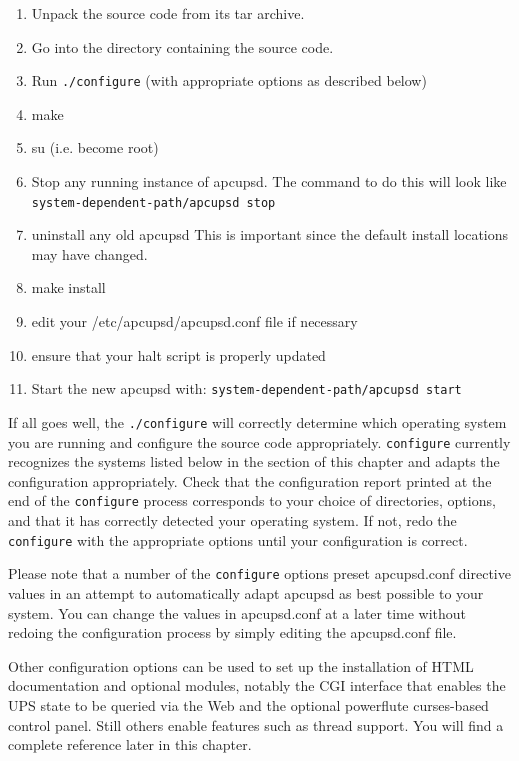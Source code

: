 \begin{enumerate}
\item Unpack the source code from its tar archive.  
\item Go into the directory containing the source code.  
\item Run {\tt ./configure} (with appropriate options as described below)  
\item make  
\item su (i.e. become root)  
\item Stop any running instance of apcupsd.  The command to do this will look
like {\tt \lt{}system-dependent-path\gt{}/apcupsd stop}  
\item uninstall any old apcupsd This is important since the default install
locations may have changed.  
\item make install  
\item edit your /etc/apcupsd/apcupsd.conf file if necessary  
\item ensure that your halt script is properly updated  
\item Start the new apcupsd with: {\tt \lt{}system-dependent-path\gt{}/apcupsd
start}  
\end{enumerate}

If all goes well, the {\tt ./configure} will correctly determine which
operating system you are running and configure the source code appropriately.
{\tt configure} currently recognizes the systems listed below in the 
section of this chapter and adapts the configuration appropriately.  Check
that the configuration report printed at the end of the {\tt configure}
process corresponds to your choice of directories, options, and that it has
correctly detected your operating system.  If not, redo the {\tt configure}
with the appropriate options until your configuration is correct.  

Please note that a number of the {\tt configure} options preset apcupsd.conf
directive values in an attempt to automatically adapt apcupsd as best possible
to your system.  You can change the values in apcupsd.conf at a later time
without redoing the configuration process by simply editing the apcupsd.conf
file.  

Other configuration options can be used to set up the installation of HTML
documentation and optional modules, notably the CGI interface that enables the
UPS state to be queried via the Web and the optional powerflute curses-based
control panel.  Still others enable features such as thread support.  You will
find a complete reference later in this chapter.  

